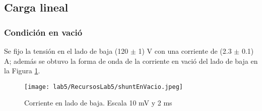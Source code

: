 \documentclass[11pt,letterpaper]{article}     %
\begin{document}
\subsection{Carga lineal}
\subsubsection{Condición en vació}
Se fijo la tensión en el lado de baja (120 $\pm$ 1) V con una corriente de (2.3 $\pm$ 0.1) A; además se obtuvo la forma de onda de la corriente en vació del lado de baja en la Figura \ref{ShuntEnVacio}.
\begin{figure}[H]
    \centering
    \texttt{[image: lab5/RecursosLab5/shuntEnVacio.jpeg]}
    \caption{Corriente en lado de baja. Escala 10 mV y 2 ms }
    \label{ShuntEnVacio}
\end{figure}
\end{document}
